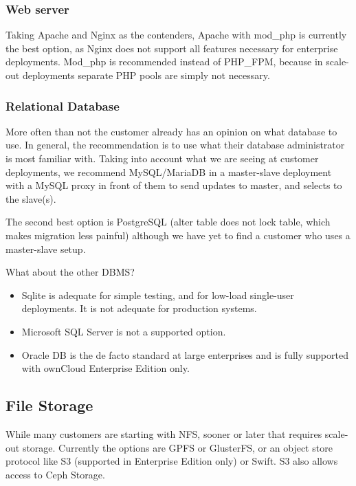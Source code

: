 \documentclass[letterpaper,10pt,english]{sphinxmanual}
\begin{document}
\subsubsection{Web server}
\label{installation/deployment_recommendations:web-server}
Taking Apache and Nginx as the contenders, Apache with mod\_php is currently the
best option, as Nginx does not support all features necessary for enterprise
deployments. Mod\_php is recommended instead of PHP\_FPM, because in scale-out
deployments separate PHP pools are simply not necessary.


\subsubsection{Relational Database}
\label{installation/deployment_recommendations:relational-database}
More often than not the customer already has an opinion on what database to
use. In general, the recommendation is to use what their database administrator
is most familiar with. Taking into account what we are seeing at customer
deployments, we recommend MySQL/MariaDB in a master-slave deployment with a
MySQL proxy in front of them to send updates to master, and selects to the
slave(s).

The second best option is PostgreSQL (alter table does not lock table, which
makes migration less painful) although we have yet to find a customer who uses a
master-slave setup.

What about the other DBMS?
\begin{itemize}
\item {} 
Sqlite is adequate for simple testing, and for low-load single-user
deployments. It is not adequate for production systems.

\item {} 
Microsoft SQL Server is not a supported option.

\item {} 
Oracle DB is the de facto standard at large enterprises and is fully
supported with ownCloud Enterprise Edition only.

\end{itemize}


\subsection{File Storage}
\label{installation/deployment_recommendations:file-storage}
While many customers are starting with NFS, sooner or later that requires scale-out storage. Currently the options are GPFS or GlusterFS, or an object store protocol like S3 (supported in Enterprise Edition only) or Swift. S3 also allows access to Ceph Storage.
\end{document}
